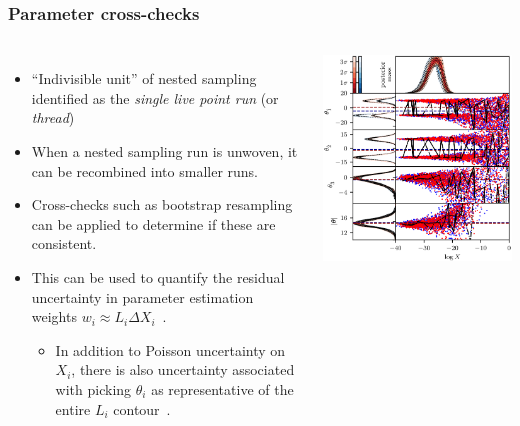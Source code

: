 \documentclass[aspectratio=169,handout]{beamer}
\begin{document}
\begin{frame}
    \frametitle{Parameter cross-checks}
    \begin{columns}
        \begin{itemize}
            \item ``Indivisible unit'' of nested sampling identified as the \emph{single live point run} (or \emph{thread})
            \item When a nested sampling run is unwoven, it can be recombined into smaller runs.
            \item Cross-checks such as bootstrap resampling can be applied to determine if these are consistent.
            \item This can be used to quantify the residual uncertainty in parameter estimation weights $w_i\approx L_i \Delta X_i$~.
                \begin{itemize}
                    \item In addition to Poisson uncertainty on $X_i$, there is also uncertainty associated with picking $\theta_i$ as representative of the entire $L_i$ contour~.
                \end{itemize}
        \end{itemize}
        \includegraphics[width=\textwidth]{figures/nestcheck}
    \end{columns}
\end{frame}
\end{document}
